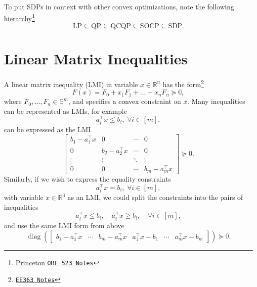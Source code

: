 \documentclass[a4paper]{article}
\DeclareMathOperator{\diag}{diag}
\begin{document}
To put SDPs in context with other convex optimizations, note the following hierarchy\footnote{\href{http://www.princeton.edu/~amirali/Public/Teaching/ORF523/S16/ORF523_S16_Lec9_gh.pdf}{Princeton \texttt{ORF 523 Notes}}}
\begin{equation*}
\text{LP}\subseteq\text{QP}\subseteq\text{QCQP}\subseteq\text{SOCP}\subseteq\text{SDP}.
\end{equation*}

\section*{Linear Matrix Inequalities}
A linear matrix inequality (LMI) in variable $x\in\mathbb{R}^n$ has the form\footnote{\href{https://stanford.edu/class/ee363/sessions/s4notes.pdf}{\texttt{EE363 Notes}}}
\begin{equation}
F(x) = F_0 + x_1F_1 + \dots + x_nF_n \succeq 0,
\end{equation}
where $F_0,\dots,F_n\in\mathbb{S}^m$, and specifies a convex constraint on $x$.
Many inequalities can be represented as LMIs, for example
\begin{equation*}
a_i^\top x \le b_i,\;\forall i\in[m],
\end{equation*}
can be expressed as the LMI
\begin{equation*}
\begin{bmatrix}
b_1 - a_1^\top x &       0          & \cdots &    0   \\
      0          & b_2 - a_2^\top x & \cdots &    0   \\
   \vdots        &     \vdots       & \ddots & \vdots \\
      0          &       0          & \cdots & b_m - a_m^\top x
\end{bmatrix} \succeq 0.
\end{equation*}
Similarly, if we wish to express the equality constraints
\begin{equation*}
a_i^\top x = b_i,\;\forall i\in[m],
\end{equation*}
with variable $x\in\mathbb{R}^3$ as an LMI, we could split the constraints into the pairs of inequalities
\begin{equation*}
a_i^\top x \le b_i, \quad a_i^\top x \ge b_i,\quad\forall i\in[m],
\end{equation*}
and use the same LMI form from above
\begin{equation*}
\diag(\begin{bmatrix}b_1-a_1^\top x & \cdots & b_m-a_m^\top x & a_1^\top x - b_1 & \cdots & a_m^\top x - b_m \end{bmatrix}) \succeq 0.
\end{equation*}
\end{document}
